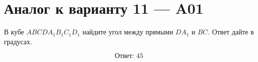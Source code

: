 \documentclass[12pt,a4paper]{article}
\begin{document}
\section*{Аналог к варианту 11 — A01}

В кубе \(ABCDA_1B_1C_1D_1\) найдите угол между прямыми \(DA_1\) и \(BC\). Ответ дайте в градусах.

\begin{center}
\end{center}

\[
\boxed{\text{Ответ: }45}
\]
\end{document}
